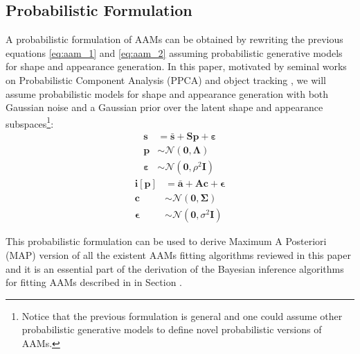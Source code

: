 \subsection{Probabilistic Formulation}
\label{sec:prob_aam}

A probabilistic formulation of AAMs can be obtained by rewriting the previous equations \ref{eq:aam_1} and \ref{eq:aam_2} assuming probabilistic generative models for shape and appearance generation. In this paper, motivated by seminal works on Probabilistic Component Analysis (PPCA) and object tracking \cite{Tipping1999, Roweis1998, Moghaddam1997}, we will assume probabilistic models for shape and appearance generation with both Gaussian noise and a Gaussian prior over the latent shape and appearance subspaces\footnote{Notice that the previous formulation is general and one could assume other probabilistic generative models \cite{vanderMaaten2010, Bach2005, Prince2012, Nicolau2014} to define novel probabilistic versions of AAMs.}:
\begin{equation}
	\begin{aligned}
		\mathbf{s} & = \bar{\mathbf{s}} + \mathbf{S} \mathbf{p} + \boldsymbol{\varepsilon}
		\\
		\mathbf{p} & \sim \mathcal{N} \left( \mathbf{0}, \mathbf{\Lambda} \right) 
		\\
		\boldsymbol{\varepsilon} & \sim \mathcal{N} \left( \mathbf{0}, \rho^2 \mathbf{I} \right) 
	\end{aligned}
\end{equation}
\begin{equation}
	\begin{aligned}
		\mathbf{i}[\mathbf{p}] & = \bar{\mathbf{a}} + \mathbf{A} \mathbf{c} + \boldsymbol{\epsilon}
		\\
		\mathbf{c} & \sim \mathcal{N} \left( \mathbf{0}, \mathbf{\Sigma} \right) 
		\\
		\boldsymbol{\epsilon} & \sim \mathcal{N} \left( \mathbf{0}, \sigma^2 \mathbf{I} \right) 
	\end{aligned}
\end{equation}

This probabilistic formulation can be used to derive Maximum A Posteriori (MAP) version of all the existent AAMs fitting algorithms reviewed in this paper and it is an essential part of the derivation of the Bayesian inference algorithms for fitting AAMs \cite{Alabort2014} described in in Section \cite{sec:bayes}.